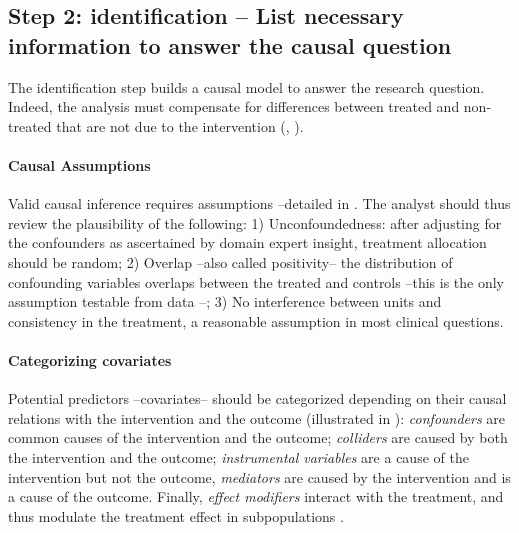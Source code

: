 \documentclass[10pt,letterpaper]{article}
\begin{document}
\subsection*{Step 2: identification -- List necessary information to answer the causal question}\label{sec:identification}

The identification step builds a causal model to answer the research question.
%
Indeed, the analysis must compensate for differences between
treated and non-treated that are not due to the intervention
(\cite[chapter~1]{pearl2018book},
\cite[chapter~1]{hernan2020causal}).

\paragraph{Causal Assumptions}

Valid causal inference requires assumptions  \cite{rubin2005causal} --detailed
in . The analyst should thus review the
plausibility of the following: 1) Unconfoundedness: after adjusting for the
confounders as ascertained by domain expert insight, treatment allocation should
be random; 2) Overlap --also called positivity-- the distribution of confounding
variables overlaps between the treated and controls --this is the only
assumption testable from data \cite{austin2015moving}--; 3) No interference
between units and consistency in the treatment, a reasonable assumption in most
clinical questions.

\paragraph{Categorizing covariates}
%
Potential predictors --covariates-- should be categorized depending on their
causal relations with the intervention and the outcome (illustrated in
): \emph{confounders} are common causes of the
intervention and the outcome; \emph{colliders} are caused by both the
intervention and the outcome; \emph{instrumental variables} are a cause of the
intervention but not the outcome, \emph{mediators} are caused by the
intervention and is a cause of the outcome. Finally, \emph{effect modifiers}
interact with the treatment, and thus
modulate the treatment effect in subpopulations \cite{attia2022proposal}.
\end{document}
